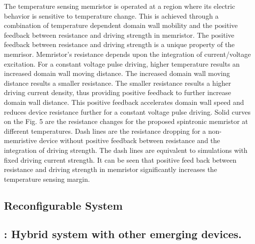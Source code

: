 The temperature sensing memristor is operated at a region where its electric behavior is sensitive to temperature change. This is achieved through a combination of temperature dependent domain wall mobility and the positive feedback between resistance and driving strength in memristor. The positive feedback between resistance and driving strength is a unique property of the memrisor. Memristor's resistance depends upon the integration of current/voltage excitation. For a constant voltage pulse driving, higher temperature results an increased domain wall moving distance. The increased domain wall moving distance results a smaller resistance. The smaller resistance results a higher driving current density, thus providing positive feedback to further increase domain wall distance. This positive feedback accelerates domain wall speed and reduces device resistance further for a constant voltage pulse driving. Solid curves on the Fig. 5 are the resistance changes for the proposed spintronic memristor at different temperatures. Dash lines are the resistance dropping for a non-memristive device without positive feedback between resistance and the integration of driving strength.  The dash lines are equivalent to simulations with fixed driving current strength. It can be seen that positive feed back between resistance and driving strength in memristor significantly increases the temperature sensing margin.

\subsection{Reconfigurable System}

\subsection{: Hybrid system with other emerging devices.}


